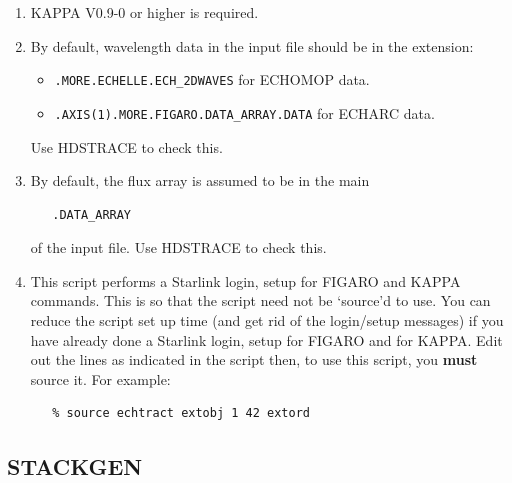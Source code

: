 \documentclass[twoside,11pt]{article}
\newcommand{\stardocinitials}  {SC}
\newcommand{\stardocnumber}    {3.2-0} %
\newcommand{\stardocname}{\stardocinitials /\stardocnumber}
\newcommand{\xref}[3]{#1}
\newcommand{\xlabel}[1]{}
\begin{document}
\begin{description}
\begin{enumerate}
\item \xref{KAPPA}{sun95}{} V0.9-0 or higher is required.

\item By default, wavelength data in the input file should be in the
      extension:

\begin{itemize}

\item \verb+.MORE.ECHELLE.ECH_2DWAVES+ for \xref{ECHOMOP}{sun152}{} data.

\item \verb+.AXIS(1).MORE.FIGARO.DATA_ARRAY.DATA+ for
      \xref{ECHARC}{sun86}{ECHARC} data.

\end{itemize}

      Use \xref{HDSTRACE}{sun102}{} to check this.

\item By default, the flux array is assumed to be in the main

\begin{verbatim}
   .DATA_ARRAY
\end{verbatim}

       of the input file.  Use HDSTRACE to check this.

\item This script performs a Starlink login, setup for FIGARO
      and KAPPA commands.  This is so that the script need not be
      `source'd to use.  You can reduce the script set up time (and
      get rid of the login/setup messages) if you have already done a
      Starlink login, setup for FIGARO and for KAPPA.  Edit out the
      lines as indicated in the script then, to use this script, you
      {\bf must} source it.  For example:

\begin{verbatim}
   % source echtract extobj 1 42 extord
\end{verbatim}
\end{enumerate}
\end{description}


\newpage
\subsection{\label{se_stackgen}\xlabel{STACKGEN}STACKGEN}
\markboth{STACKGEN}{\stardocname}
\end{document}
